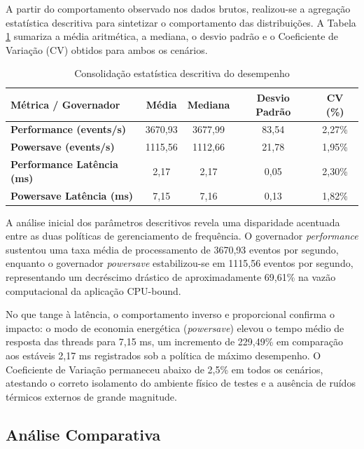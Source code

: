 \documentclass[12pt]{article}
\begin{document}
A partir do comportamento observado nos dados brutos, realizou-se a agregação estatística descritiva para sintetizar o comportamento das distribuições. A Tabela \ref{tab:estatistica_descritiva} sumariza a média aritmética, a mediana, o desvio padrão e o Coeficiente de Variação (CV) obtidos para ambos os cenários.

\begin{table}[ht]
\centering
\caption{Consolidação estatística descritiva do desempenho}
\label{tab:estatistica_descritiva}
\begin{tabular}{|l|c|c|c|c|}
\hline
\textbf{Métrica / Governador} & \textbf{Média} & \textbf{Mediana} & \textbf{Desvio Padrão} & \textbf{CV (\%)} \\ \hline
\textbf{Performance (events/s)}    & 3670,93 & 3677,99 & 83,54 & 2,27\% \\ \hline
\textbf{Powersave (events/s)}      & 1115,56 & 1112,66 & 21,78 & 1,95\% \\ \hline
\textbf{Performance Latência (ms)} & 2,17    & 2,17    & 0,05  & 2,30\% \\ \hline
\textbf{Powersave Latência (ms)}   & 7,15    & 7,16    & 0,13  & 1,82\% \\ \hline
\end{tabular}
\end{table}

A análise inicial dos parâmetros descritivos revela uma disparidade acentuada entre as duas políticas de gerenciamento de frequência. O governador \textit{performance} sustentou uma taxa média de processamento de 3670,93 eventos por segundo, enquanto o governador \textit{powersave} estabilizou-se em 1115,56 eventos por segundo, representando um decréscimo drástico de aproximadamente 69,61\% na vazão computacional da aplicação CPU-bound. 

No que tange à latência, o comportamento inverso e proporcional confirma o impacto: o modo de economia energética (\textit{powersave}) elevou o tempo médio de resposta das threads para 7,15 ms, um incremento de 229,49\% em comparação aos estáveis 2,17 ms registrados sob a política de máximo desempenho. O Coeficiente de Variação permaneceu abaixo de 2,5\% em todos os cenários, atestando o correto isolamento do ambiente físico de testes e a ausência de ruídos térmicos externos de grande magnitude.

\subsection{Análise Comparativa}
\end{document}
